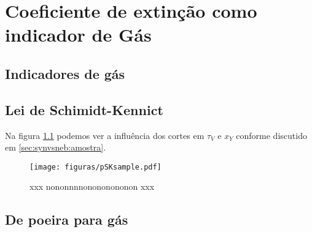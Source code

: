 



\chapter{Coeficiente de extinção como indicador de Gás}
\label{sec:gas}
\section{Indicadores de gás}
\label{sec:synvsneb:proxies}
\section{Lei de Schimidt-Kennict}
\label{sec:synvsneb:proxies}
Na figura \ref{fig:pSK_sample} podemos ver a influência dos cortes em $\tau_V$ e $x_Y$ conforme
discutido em \ref{sec:synvsneb:amostra}.

\begin{figure}
	\centering
	\texttt{[image: figuras/pSKsample.pdf]}
	\caption[Efeitos de configuração de mínimo de população jovem e de mínimo coeficiente de extinção.]
	{xxx nononnnnonononononon xxx}
	\label{fig:pSK_sample}
\end{figure}


\section{De poeira para gás}
\label{sec:synvsneb:proxies}

